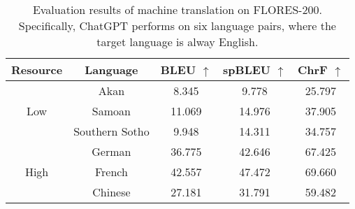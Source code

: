 \begin{table}[ht]
    \centering
    \begin{tabular}{ccccc}\toprule
        Resource & Language & BLEU $\uparrow$ &spBLEU $\uparrow$ & ChrF $\uparrow$\\\midrule
      \multirow{3}{*}{Low} & Akan  & 8.345& 9.778
& 25.797\\
&Samoan
&11.069
&14.976
&37.905\\
&Southern Sotho
&9.948
&14.311
&34.757\\\midrule
\multirow{3}{*}{High}
&German
&36.775
&42.646
&67.425\\
&French
&42.557
&47.472
&69.660\\
&Chinese
&27.181
&31.791
&59.482\\\bottomrule



    \end{tabular}
    \caption{Evaluation results of machine translation on FLORES-200. Specifically, ChatGPT performs on six language pairs, where the target language is alway English.}
    \label{tab:flores}
\end{table}
